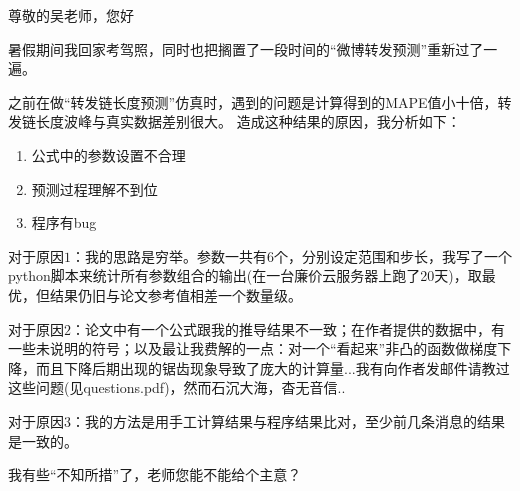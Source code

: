 \documentclass[UTF8]{ctexart}
\begin{document}
\par 尊敬的吴老师，您好
\newline
\par 暑假期间我回家考驾照，同时也把搁置了一段时间的“微博转发预测”重新过了一遍。
\par 之前在做“转发链长度预测”仿真时，遇到的问题是计算得到的MAPE值小十倍，转发链长度波峰与真实数据差别很大。
造成这种结果的原因，我分析如下：
\begin{enumerate}[\indent 1)]
\item 公式中的参数设置不合理
\item 预测过程理解不到位
\item 程序有bug
\end{enumerate}
\par 对于原因$1$：我的思路是穷举。参数一共有6个，分别设定范围和步长，我写了一个python脚本来统计所有参数组合的输出(在一台廉价云服务器上跑了20天)，取最优，但结果仍旧与论文参考值相差一个数量级。
\par 对于原因$2$：论文中有一个公式跟我的推导结果不一致；在作者提供的数据中，有一些未说明的符号；以及最让我费解的一点：对一个“看起来”非凸的函数做梯度下降，而且下降后期出现的锯齿现象导致了庞大的计算量...我有向作者发邮件请教过这些问题(见questions.pdf)，然而石沉大海，杳无音信..
\par 对于原因$3$：我的方法是用手工计算结果与程序结果比对，至少前几条消息的结果是一致的。
\newline
\par 我有些“不知所措”了，老师您能不能给个主意？
\newline
\par {}
\end{document}

